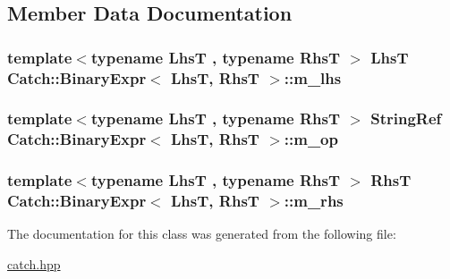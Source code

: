 \subsection{Member Data Documentation}
\hypertarget{class_catch_1_1_binary_expr_a306b29e77b48f9c538c5031a59adc4ce}{
\subsubsection[{m\-\_\-lhs}]{\setlength{\rightskip}{0pt plus 5cm}template$<$typename Lhs\-T , typename Rhs\-T $>$ Lhs\-T {\bf Catch\-::\-Binary\-Expr}$<$ Lhs\-T, Rhs\-T $>$\-::m\-\_\-lhs\hspace{0.3cm}{\ttfamily [private]}}}\label{class_catch_1_1_binary_expr_a306b29e77b48f9c538c5031a59adc4ce}
\hypertarget{class_catch_1_1_binary_expr_ab21dea40c53fd64d4f7a073dbe93ec95}{
\subsubsection[{m\-\_\-op}]{\setlength{\rightskip}{0pt plus 5cm}template$<$typename Lhs\-T , typename Rhs\-T $>$ {\bf String\-Ref} {\bf Catch\-::\-Binary\-Expr}$<$ Lhs\-T, Rhs\-T $>$\-::m\-\_\-op\hspace{0.3cm}{\ttfamily [private]}}}\label{class_catch_1_1_binary_expr_ab21dea40c53fd64d4f7a073dbe93ec95}
\hypertarget{class_catch_1_1_binary_expr_a54cb1629bf304ebe0c1560f4cc2bc186}{
\subsubsection[{m\-\_\-rhs}]{\setlength{\rightskip}{0pt plus 5cm}template$<$typename Lhs\-T , typename Rhs\-T $>$ Rhs\-T {\bf Catch\-::\-Binary\-Expr}$<$ Lhs\-T, Rhs\-T $>$\-::m\-\_\-rhs\hspace{0.3cm}{\ttfamily [private]}}}\label{class_catch_1_1_binary_expr_a54cb1629bf304ebe0c1560f4cc2bc186}


The documentation for this class was generated from the following file\-:\begin{DoxyCompactItemize}
\item 
\hyperlink{catch_8hpp}{catch.\-hpp}\end{DoxyCompactItemize}
